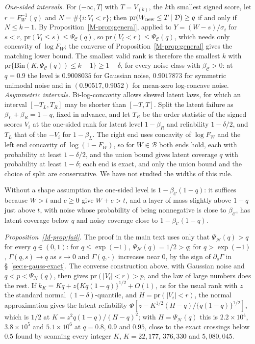 \documentclass[12pt]{article}
\renewcommand{\_}{\usc\allowbreak}
\theoremstyle{definition}
\numberwithin{equation}{section}
\newcommand{\pr}{\mathrm{pr}}
\newcommand{\B}{\mathcal{B}}
\newcommand{\E}{\mathcal{C}}
\newcommand{\N}{\mathcal{N}}
\newcommand{\Bin}{\mathrm{Bin}}
\begin{document}
\emph{One-sided intervals.} For $(-\infty, T]$ with $T = V_{(k)}$, the $k$th smallest signed score, let $r = F_W^{-1}(q)$ and $N = \#\{i : V_i < r\}$; then $\pr(W_{\rm new} \le T \mid \mathcal D) \ge q$ if and only if $N \le k - 1$. By Proposition~\ref{M-prop:general}, applied to $Y = (W - s)/\sigma_i$ for $s < r$, $\pr(V_i \le s) \le \Psi_{\E}(q)$, so $\pr(V_i < r) \le \Psi_{\E}(q)$, which needs only concavity of $\log F_W$; the converse of Proposition~\ref{M-prop:general} gives the matching lower bound. The smallest valid rank is therefore the smallest $k$ with $\pr\{\Bin(K, \Psi_{\E}(q)) \le k - 1\} \ge 1 - \delta$, for every noise class with $\beta_{\E} > 0$: at $q = 0.9$ the level is $0.9008035$ for Gaussian noise, $0.9017873$ for symmetric unimodal noise and in $(0.90517, 0.9052)$ for mean-zero log-concave noise. \emph{Asymmetric intervals.} Bi-log-concavity allows skewed latent laws, for which an interval $[-T_L, T_R]$ may be shorter than $[-T, T]$. Split the latent failure as $\beta_L + \beta_R = 1 - q$, fixed in advance, and let $T_R$ be the order statistic of the signed scores $V_i$ at the one-sided rank for latent level $1 - \beta_R$ and reliability $1 - \delta/2$, and $T_L$ that of the $-V_i$ for $1 - \beta_L$. The right end uses concavity of $\log F_W$ and the left end concavity of $\log(1 - F_W)$, so for $W \in \B$ both ends hold, each with probability at least $1 - \delta/2$, and the union bound gives latent coverage $q$ with probability at least $1 - \delta$; each end is exact, and only the union bound and the choice of split are conservative. We have not studied the widths of this rule.

Without a shape assumption the one-sided level is $1 - \beta_{\E}(1 - q)$: it suffices because $W > t$ and $e \ge 0$ give $W + e > t$, and a layer of mass slightly above $1 - q$ just above $t$, with noise whose probability of being nonnegative is close to $\beta_{\E}$, has latent coverage below $q$ and noisy coverage close to $1 - \beta_{\E}(1 - q)$.

\emph{Proposition~\ref{M-prop:fail}.} The proof in the main text uses only that $\Psi_{\N}(q) > q$ for every $q \in (0, 1)$: for $q \le \exp(-1)$, $\Psi_{\N}(q) = 1/2 > q$; for $q > \exp(-1)$, $\Gamma(q, s) \to q$ as $s \to 0$ and $\Gamma(q, \cdot)$ increases near $0$, by the sign of $\partial_s\Gamma$ in \S~\ref{sec:s-gauss-exact}. The converse construction above, with Gaussian noise and $q < p < \Psi_{\N}(q)$, then gives $\pr(|V_i| < r) > p$, and the law of large numbers does the rest. If $k_K = Kq + z\{Kq(1 - q)\}^{1/2} + O(1)$, as for the usual rank with $z$ the standard normal $(1 - \delta)$-quantile, and $H = \pr(|V_i| < r)$, the normal approximation gives the latent reliability $\Phi[z - K^{1/2}(H - q)/\{q(1 - q)\}^{1/2}]$, which is $1/2$ at $K = z^2q(1 - q)/(H - q)^2$; with $H = \Psi_{\N}(q)$ this is $2.2 \times 10^4$, $3.8 \times 10^5$ and $5.1 \times 10^6$ at $q = 0.8$, $0.9$ and $0.95$, close to the exact crossings below $0.5$ found by scanning every integer $K$, $K = 22{,}177$, $376{,}330$ and $5{,}080{,}045$.
\end{document}
